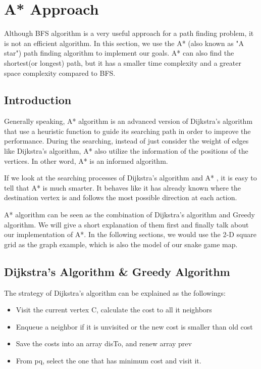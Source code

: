 \documentclass[12pt]{article}
\begin{document}
\section{A* Approach}
Although BFS algorithm is a very useful approach for a path finding problem, it is not an efficient algorithm. In this section, we use the A* (also known as "A star") path finding algorithm to implement our goals. A* can also find the shortest(or longest) path, but it has a smaller time complexity and a greater space complexity compared to BFS. 

\subsection{Introduction}
Generally speaking, A* algorithm is an advanced version of Dijkstra's algorithm that use a heuristic function to guide its searching path in order to improve the performance. During the searching, instead of just consider the weight of edges like Dijkstra's algorithm, A* also utilize the information of the positions of the vertices. In other word, A* is an informed algorithm. 

If we look at the searching processes of Dijkstra's algorithm and A* , it is easy to tell that A* is much smarter. It behaves like it has already known where the destination vertex is and follows the most possible direction at each action.

A* algorithm can be seen as the combination of Dijkstra's algorithm and Greedy algorithm. We will give a short explanation of them first and finally talk about our implementation of A*. In the following sections, we would use the 2-D square grid as the graph example, which is also the model of our snake game map.

\subsection{Dijkstra's Algorithm \& Greedy Algorithm}

The strategy of Dijkstra's algorithm can be explained as the followings:

\begin{itemize}
    \item Visit the current vertex C, calculate the cost to all it neighbors
    \item Enqueue a neighbor if it is unvisited or the new cost is smaller than old cost
    \item Save the costs into an array disTo, and renew array prev
    \item From pq, select the one that has minimum cost and visit it.
\end{itemize}
\end{document}
